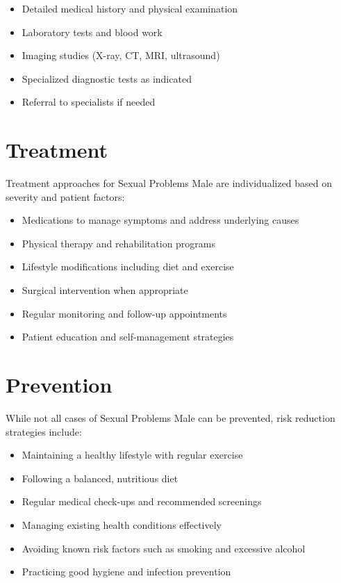 \begin{itemize}
\item Detailed medical history and physical examination
\item Laboratory tests and blood work
\item Imaging studies (X-ray, CT, MRI, ultrasound)
\item Specialized diagnostic tests as indicated
\item Referral to specialists if needed
\end{itemize}

\section*{Treatment}
Treatment approaches for Sexual Problems Male are individualized based on severity and patient factors:

\begin{itemize}
\item Medications to manage symptoms and address underlying causes
\item Physical therapy and rehabilitation programs
\item Lifestyle modifications including diet and exercise
\item Surgical intervention when appropriate
\item Regular monitoring and follow-up appointments
\item Patient education and self-management strategies
\end{itemize}

\section*{Prevention}
While not all cases of Sexual Problems Male can be prevented, risk reduction strategies include:

\begin{itemize}
\item Maintaining a healthy lifestyle with regular exercise
\item Following a balanced, nutritious diet
\item Regular medical check-ups and recommended screenings
\item Managing existing health conditions effectively
\item Avoiding known risk factors such as smoking and excessive alcohol
\item Practicing good hygiene and infection prevention
\end{itemize}

